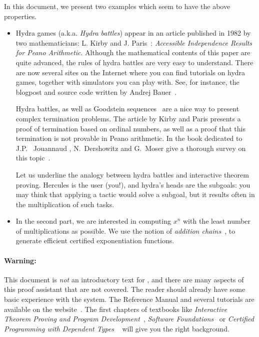 \documentclass[twoside,a4paper]{book}
\begin{document}
In this document, we present two examples which seem to have the above properties.

\begin{itemize}
\item Hydra games (a.k.a. \emph{Hydra battles}) appear in an article published in 1982 by two mathematicians:
L. Kirby and J. Paris~\cite{KP82}: \emph{Accessible Independence Results for Peano Arithmetic}. 
Although the mathematical contents of this 
paper are quite advanced, the rules of hydra battles are very easy to understand. There are now several sites on the Internet where you can find tutorials on hydra games, together with simulators you can play with. See, for instance, the blogpost and source code written by Andrej Bauer~\cite{bauer2008,BauerHydra}.



Hydra battles, as well as Goodstein sequences~\cite{goodstein_1944, KP82}
are a nice way to present complex termination problems.
The article by Kirby and Paris presents a proof of termination
based on ordinal numbers, as well as a proof that this termination is not
provable in Peano arithmetic. In the book dedicated to 
J.P. ~Jouannaud \cite{HommageJPJ}, N.~Dershowitz and G.~Moser  give a thorough survey on this topic~\cite{Dershowitz2007}.

Let us underline the analogy between hydra battles and interactive theorem proving. Hercules is the user (you!), and hydra's heads are the subgoals: you may think that applying a tactic would solve a subgoal, but it results often in the multiplication of such tasks.

\item In the second part, we are interested in computing $x^n$ with the least number of multiplications as possible. We use the notion of \emph{addition chains}~\cite{brauer1939,DBLP:journals/ipl/BerstelB87}, to generate efficient certified exponentiation functions.
\end{itemize}

\paragraph*{Warning:}

This document is \emph{not} an introductory text for \coq, and there are many aspects of this proof assistant that are not covered. 
 The reader should already have some basic experience with the \coq system. The Reference Manual and several tutorials are available on the \coq website~\cite{Coq}. The first chapters of textbooks like \emph{Interactive Theorem Proving and Program Development}~\cite{BC04}, \emph{Software Foundations}~\cite{SF} or  \emph{Certified Programming with Dependent Types} ~\cite{chlipalacpdt2011} will give you the right background.
\end{document}
